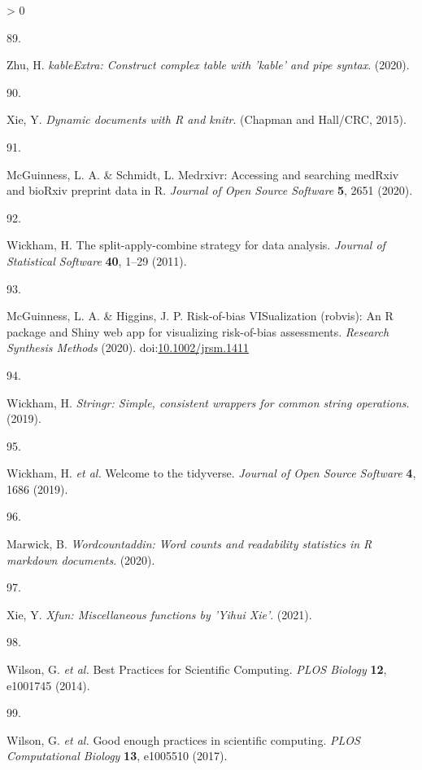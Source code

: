 \documentclass[a4paper, twoside]{templates/ociamthesis}
\newlength{\cslhangindent}
\newlength{\csllabelwidth}
\newenvironment{CSLReferences}[3] %
 {%
  \setlength{\parindent}{0pt}
  \ifodd #1 \everypar{\setlength{\hangindent}{\cslhangindent}}\ignorespaces\fi
  \ifnum #2 > 0
  \setlength{\parskip}{#2\baselineskip}
  \fi
 }%
 {}
\newcommand{\CSLLeftMargin}[1]{\parbox[t]{\maxof{\widthof{#1}}{\csllabelwidth}}{#1}}
\newcommand{\CSLRightInline}[1]{\parbox[t]{\linewidth - \csllabelwidth}{#1}}
\begin{document}
\begin{CSLReferences}{0}{0}
\leavevmode\hypertarget{ref-kableExtra}{}%
\CSLLeftMargin{89. }
\CSLRightInline{Zhu, H. \emph{{kableExtra}: {Construct} complex table with 'kable' and pipe syntax}. (2020).}

\leavevmode\hypertarget{ref-knitr}{}%
\CSLLeftMargin{90. }
\CSLRightInline{Xie, Y. \emph{Dynamic documents with {R} and knitr}. ({Chapman and Hall/CRC}, 2015).}

\leavevmode\hypertarget{ref-medrxivr}{}%
\CSLLeftMargin{91. }
\CSLRightInline{McGuinness, L. A. \& Schmidt, L. Medrxivr: {Accessing} and searching {medRxiv} and {bioRxiv} preprint data in {R}. \emph{Journal of Open Source Software} \textbf{5}, 2651 (2020).}

\leavevmode\hypertarget{ref-plyr}{}%
\CSLLeftMargin{92. }
\CSLRightInline{Wickham, H. The split-apply-combine strategy for data analysis. \emph{Journal of Statistical Software} \textbf{40}, 1--29 (2011).}

\leavevmode\hypertarget{ref-robvis}{}%
\CSLLeftMargin{93. }
\CSLRightInline{McGuinness, L. A. \& Higgins, J. P. Risk-of-bias {VISualization} (robvis): {An R} package and {Shiny} web app for visualizing risk-of-bias assessments. \emph{Research Synthesis Methods} (2020). doi:\href{https://doi.org/10.1002/jrsm.1411}{10.1002/jrsm.1411}}

\leavevmode\hypertarget{ref-stringr}{}%
\CSLLeftMargin{94. }
\CSLRightInline{Wickham, H. \emph{Stringr: {Simple}, consistent wrappers for common string operations}. (2019).}

\leavevmode\hypertarget{ref-tidyverse}{}%
\CSLLeftMargin{95. }
\CSLRightInline{Wickham, H. \emph{et al.} Welcome to the {tidyverse}. \emph{Journal of Open Source Software} \textbf{4}, 1686 (2019).}

\leavevmode\hypertarget{ref-wordcountaddin}{}%
\CSLLeftMargin{96. }
\CSLRightInline{Marwick, B. \emph{Wordcountaddin: {Word} counts and readability statistics in {R} markdown documents}. (2020).}

\leavevmode\hypertarget{ref-xfun}{}%
\CSLLeftMargin{97. }
\CSLRightInline{Xie, Y. \emph{Xfun: {Miscellaneous} functions by '{Yihui Xie}'}. (2021).}

\leavevmode\hypertarget{ref-wilson2014}{}%
\CSLLeftMargin{98. }
\CSLRightInline{Wilson, G. \emph{et al.} Best {Practices} for {Scientific Computing}. \emph{PLOS Biology} \textbf{12}, e1001745 (2014).}

\leavevmode\hypertarget{ref-wilson2017}{}%
\CSLLeftMargin{99. }
\CSLRightInline{Wilson, G. \emph{et al.} Good enough practices in scientific computing. \emph{PLOS Computational Biology} \textbf{13}, e1005510 (2017).}


\end{CSLReferences}
\end{document}
